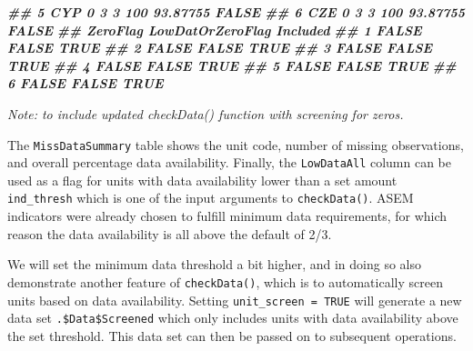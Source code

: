 \documentclass[
]{book}
\newenvironment{Shaded}{\begin{snugshade}}{\end{snugshade}}
\newcommand{\AttributeTok}[1]{\textcolor[rgb]{0.77,0.63,0.00}{#1}}
\newcommand{\CommentTok}[1]{\textcolor[rgb]{0.56,0.35,0.01}{\textit{#1}}}
\newcommand{\ConstantTok}[1]{\textcolor[rgb]{0.00,0.00,0.00}{#1}}
\newcommand{\DocumentationTok}[1]{\textcolor[rgb]{0.56,0.35,0.01}{\textbf{\textit{#1}}}}
\newcommand{\FloatTok}[1]{\textcolor[rgb]{0.00,0.00,0.81}{#1}}
\newcommand{\FunctionTok}[1]{\textcolor[rgb]{0.00,0.00,0.00}{#1}}
\newcommand{\NormalTok}[1]{#1}
\newcommand{\OtherTok}[1]{\textcolor[rgb]{0.56,0.35,0.01}{#1}}
\newcommand{\SpecialCharTok}[1]{\textcolor[rgb]{0.00,0.00,0.00}{#1}}
\newcommand{\StringTok}[1]{\textcolor[rgb]{0.31,0.60,0.02}{#1}}
\begin{document}
\begin{Shaded}
\begin{Highlighting}[]
\DocumentationTok{\#\# 5      CYP         0      3              3        100   93.87755      FALSE}
\DocumentationTok{\#\# 6      CZE         0      3              3        100   93.87755      FALSE}
\DocumentationTok{\#\#   ZeroFlag LowDatOrZeroFlag Included}
\DocumentationTok{\#\# 1    FALSE            FALSE     TRUE}
\DocumentationTok{\#\# 2    FALSE            FALSE     TRUE}
\DocumentationTok{\#\# 3    FALSE            FALSE     TRUE}
\DocumentationTok{\#\# 4    FALSE            FALSE     TRUE}
\DocumentationTok{\#\# 5    FALSE            FALSE     TRUE}
\DocumentationTok{\#\# 6    FALSE            FALSE     TRUE}
\end{Highlighting}
\end{Shaded}

\emph{Note: to include updated checkData() function with screening for zeros.}

The \texttt{MissDataSummary} table shows the unit code, number of missing observations, and overall percentage data availability. Finally, the \texttt{LowDataAll} column can be used as a flag for units with data availability lower than a set amount \texttt{ind\_thresh} which is one of the input arguments to \texttt{checkData()}. ASEM indicators were already chosen to fulfill minimum data requirements, for which reason the data availability is all above the default of 2/3.

We will set the minimum data threshold a bit higher, and in doing so also demonstrate another feature of \texttt{checkData()}, which is to automatically screen units based on data availability. Setting \texttt{unit\_screen\ =\ TRUE} will generate a new data set \texttt{.\$Data\$Screened} which only includes units with data availability above the set threshold. This data set can then be passed on to subsequent operations.

\begin{Shaded}
\end{Shaded}
\end{document}
